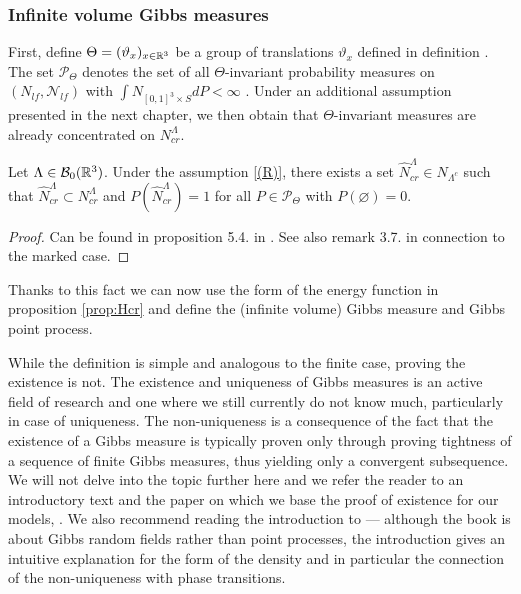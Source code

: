 \subsubsection{Infinite volume Gibbs measures}

First, define $\Theta=(\vartheta_x)_{x\in {\mathbb R^3}}$ be a group of translations $\vartheta_x$ defined in definition \label{def:potential}. The set $\mathcal P_\Theta$ denotes the set of all $\Theta$-invariant probability measures on $(N_{lf},\mathcal N_{lf})$ with $\int N_{[0,1]^3 \times S} dP< \infty $ . Under an additional assumption presented in the next chapter, we then obtain that $\Theta$-invariant measures are already concentrated on $N^\Lambda_{cr}$.

\begin{proposition}
	Let $\Lambda \in \mathcal B_0({\mathbb R^3})$. Under the assumption \ref{(R)}, there exists a set $\hat N^\Lambda_{cr} \in N_{\Lambda^c}$ such that $\hat N^\Lambda_{cr} \subset N^\Lambda_{cr}$ and $P(\hat N^\Lambda_{cr})=1$ for all $P \in \mathcal P_\Theta$ with $P(\varnothing)=0$.
\end{proposition}
\begin{proof}
	Can be found in proposition 5.4. in \cite{DDG12}. See also remark 3.7. in connection to the marked case.
\end{proof}

Thanks to this fact we can now use the form of the energy function in proposition \ref{prop:Hcr} and define the (infinite volume) Gibbs measure and Gibbs point process.

\begin{definition}

\end{definition}


While the definition is simple and analogous to the finite case, proving the existence is not. The existence and uniqueness of Gibbs measures is an active field of research and one where we still currently do not know much, particularly in case of uniqueness. The non-uniqueness is a consequence of the fact that the existence of a Gibbs measure is typically proven only through proving tightness of a sequence of finite Gibbs measures, thus yielding only a convergent subsequence. We will not delve into the topic further here and we refer the reader to an introductory text \cite{Dereudre2017} and the paper on which we base the proof of existence for our models, \cite{DDG12}. We also recommend reading the introduction to \cite{Georgii2011} --- although the book is about Gibbs random fields rather than point processes, the introduction gives an intuitive explanation for the form of the density and in particular the connection of the non-uniqueness with phase transitions.



